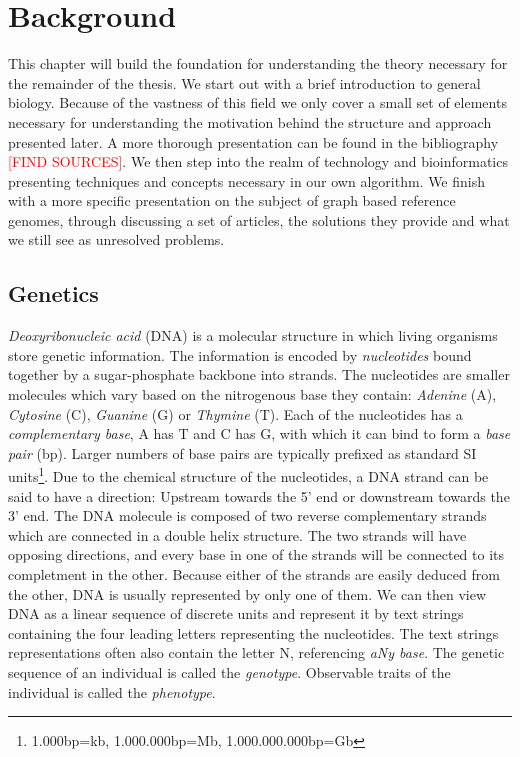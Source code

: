 \documentclass[thesis.tex]{subfiles}
\begin{document}
\chapter{Background}
This chapter will build the foundation for understanding the theory necessary for the remainder of the thesis. We start out with a brief introduction to general biology. Because of the vastness of this field we only cover a small set of elements necessary for understanding the motivation behind the structure and approach presented later. A more thorough presentation can be found in the bibliography \textcolor{red}{[FIND SOURCES]}. We then step into the realm of technology and bioinformatics presenting techniques and concepts necessary in our own algorithm. We finish with a more specific presentation on the subject of graph based reference genomes, through discussing a set of articles, the solutions they provide and what we still see as unresolved problems.
\section{Genetics}
\textit{Deoxyribonucleic acid} (DNA) is a molecular structure in which living organisms store genetic information. The information is encoded by \textit{nucleotides} bound together by a sugar-phosphate backbone into strands. The nucleotides are smaller molecules which vary based on the nitrogenous base they contain: \textit{Adenine} (A), \textit{Cytosine} (C), \textit{Guanine} (G) or \textit{Thymine} (T). Each of the nucleotides has a \textit{complementary base}, A has T and C has G, with which it can bind to form a \textit{base pair} (bp). Larger numbers of base pairs are typically prefixed as standard SI units\footnote{1.000bp=kb, 1.000.000bp=Mb, 1.000.000.000bp=Gb}. Due to the chemical structure of the nucleotides, a DNA strand can be said to have a direction: Upstream towards the 5' end or downstream towards the 3' end. The DNA molecule is composed of two reverse complementary strands which are connected in a double helix structure. The two strands will have opposing directions, and every base in one of the strands will be connected to its completment in the other. Because either of the strands are easily deduced from the other, DNA is usually represented by only one of them. We can then view DNA as a linear sequence of discrete units and represent it by text strings containing the four leading letters representing the nucleotides. The text strings representations often also contain the letter N, referencing \textit{aNy base}. The genetic sequence of an individual is called the \textit{genotype}. Observable traits of the individual is called the \textit{phenotype}.
\end{document}
